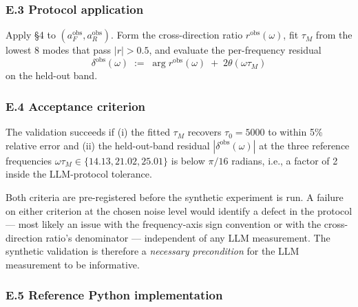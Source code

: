 \documentclass[
  letterpaper,
  11pt]{article}
\theoremstyle{plain}
\theoremstyle{definition}
\theoremstyle{remark}
\begin{document}
\subsubsection{E.3 Protocol application}\label{e.3-protocol-application}

Apply §4 to \((a_F^\text{obs}, a_R^\text{obs})\). Form the cross-direction ratio \(r^\text{obs}(\omega)\), fit \(\tau_M\) from the lowest 8 modes that pass \(|r| > 0.5\), and evaluate the per-frequency residual
\[\delta^\text{obs}(\omega) \;:=\; \arg r^\text{obs}(\omega) \;+\; 2\theta(\omega \tau_M)\]
on the held-out band.

\subsubsection{E.4 Acceptance criterion}\label{e.4-acceptance-criterion}

The validation succeeds if (i) the fitted \(\tau_M\) recovers \(\tau_0 = 5000\) to within 5\% relative error and (ii) the held-out-band residual \(|\delta^\text{obs}(\omega)|\) at the three reference frequencies \(\omega\tau_M \in \{14.13, 21.02, 25.01\}\) is below \(\pi/16\) radians, i.e., a factor of 2 inside the LLM-protocol tolerance.

Both criteria are pre-registered before the synthetic experiment is run. A failure on either criterion at the chosen noise level would identify a defect in the protocol --- most likely an issue with the frequency-axis sign convention or with the cross-direction ratio's denominator --- independent of any LLM measurement. The synthetic validation is therefore a \emph{necessary precondition} for the LLM measurement to be informative.

\subsubsection{E.5 Reference Python implementation}\label{e.5-reference-python-implementation}
\end{document}
